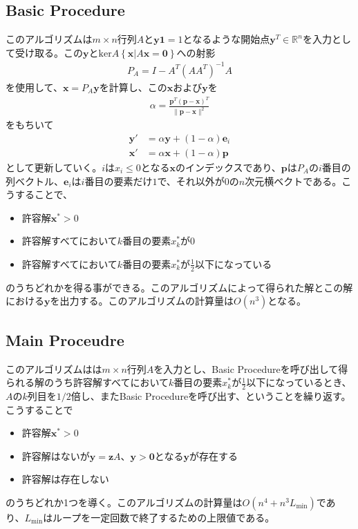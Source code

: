 \subsection{Basic Procedure}
このアルゴリズムは$m \times n$行列$A$と$\mathbf{y} \mathbf{1} = 1$となるような開始点$\mathbf{y}^T \in \mathbb{R}^n$を入力として受け取る。この$\mathbf{y}$と$\mathrm{ker}A \left\{\mathbf{x} | A \mathbf{x} = \mathbf{0}\right\}$への射影
\begin{align*}
  P_A = I - A^T (A A^T)^{-1} A
\end{align*}
を使用して、$\mathbf{x} = P_A \mathbf{y}$を計算し、この$\mathbf{x}$および$\mathbf{y}$を
\begin{align*}
  \alpha = \frac{\mathbf{p}^T (\mathbf{p} - \mathbf{x})^T}{\|\mathbf{p} - \mathbf{x}\|^2}
\end{align*}
をもちいて
\begin{align*}
  \mathbf{y}' & = \alpha \mathbf{y} + (1 - \alpha) \mathbf{e}_i \\
  \mathbf{x}' & = \alpha \mathbf{x} + (1 - \alpha) \mathbf{p}
\end{align*}
として更新していく。$i$は$x_i \leq 0$となる$\mathbf{x}$のインデックスであり、$\mathbf{p}$は$P_A$の$i$番目の列ベクトル、$\mathbf{e}_i$は$i$番目の要素だけ$1$で、それ以外が$0$の$n$次元横ベクトである。こうすることで、
\begin{itemize}
  \item 許容解$\mathbf{x}^* > 0$
  \item 許容解すべてにおいて$k$番目の要素$x_k^*$が$0$
  \item 許容解すべてにおいて$k$番目の要素$x_k^*$が$\frac{1}{2}$以下になっている
\end{itemize}
のうちどれかを得る事ができる。このアルゴリズムによって得られた解とこの解における$\mathbf{y}$を出力する。このアルゴリズムの計算量は$O(n^3)$となる。

\subsection{Main Proceudre}
このアルゴリズムはは$m \times n$行列$A$を入力とし、Basic Procedureを呼び出して得られる解のうち許容解すべてにおいて$k$番目の要素$x_k^*$が$\frac{1}{2}$以下になっているとき、$A$の$k$列目を$1 / 2$倍し、またBasic Procedureを呼び出す、ということを繰り返す。こうすることで
\begin{itemize}
  \item 許容解$\mathbf{x}^* > 0$
  \item 許容解はないが$\mathbf{y} = \mathbf{z} A、\mathbf{y} > \mathbf{0}$となる$\mathbf{y}$が存在する
  \item 許容解は存在しない
\end{itemize}
のうちどれか1つを導く。このアルゴリズムの計算量は$O(n^4 + n^3 L_{\text{min}})$であり、$L_{\text{min}}$はループを一定回数で終了するための上限値である。

